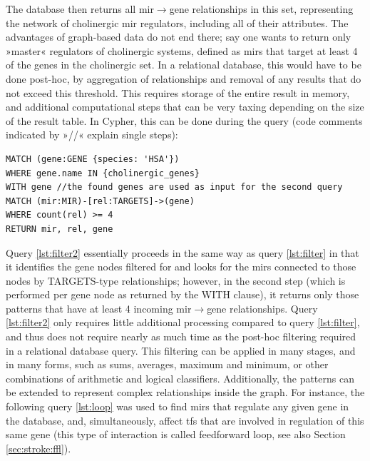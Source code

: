 The database then returns all \ac{mir}$\to$gene relationships in this set, representing the network of cholinergic \ac{mir} regulators, including all of their attributes. The advantages of graph-based data do not end there; say one wants to return only »master« regulators of cholinergic systems, defined as \acp{mir} that target at least 4 of the genes in the cholinergic set. In a relational database, this would have to be done post-hoc, by aggregation of relationships and removal of any results that do not exceed this threshold. This requires storage of the entire result in memory, and additional computational steps that can be very taxing depending on the size of the result table. In Cypher, this can be done during the query (code comments indicated by »\textcolor{dkgreen}{//}« explain single steps):

\begin{lstlisting}[label=lst:filter2,caption=Two-stage Filtering,
language=Cypher]
MATCH (gene:GENE {species: 'HSA'})
WHERE gene.name IN {cholinergic_genes}
WITH gene //the found genes are used as input for the second query
MATCH (mir:MIR)-[rel:TARGETS]->(gene)
WHERE count(rel) >= 4
RETURN mir, rel, gene
\end{lstlisting}

Query \ref{lst:filter2} essentially proceeds in the same way as query \ref{lst:filter} in that it identifies the gene nodes filtered for and looks for the \acp{mir} connected to those nodes by TARGETS-type relationships; however, in the second step (which is performed per gene node as returned by the \textcolor{dkblue}{WITH} clause), it returns only those patterns that have at least 4 incoming \ac{mir}$\to$gene relationships. Query \ref{lst:filter2} only requires little additional processing compared to query \ref{lst:filter}, and thus does not require nearly as much time as the post-hoc filtering required in a relational database query. This filtering can be applied in many stages, and in many forms, such as sums, averages, maximum and minimum, or other combinations of arithmetic and logical classifiers. Additionally, the patterns can be extended to represent complex relationships inside the graph. For instance, the following query \ref{lst:loop} was used to find \acp{mir} that regulate any given gene in the database, and, simultaneously, affect \acp{tf} that are involved in regulation of this same gene (this type of interaction is called feedforward loop, see also Section \ref{sec:stroke:ffl}).

